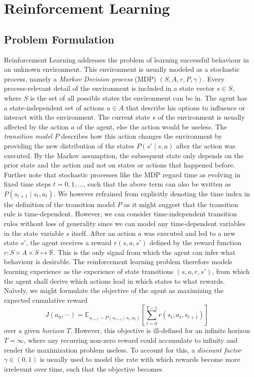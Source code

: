 \documentclass[a4paper, 11pt]{article}
\begin{document}
	\section{Reinforcement Learning}
	\subsection{Problem Formulation}
	Reinforcement Learning addresses the problem of learning successful behaviour in an unknown environment. This environment is usually modeled as a stochastic process, namely a \textit{Markov Decision process} (MDP) $(S,A,r,P,\gamma)$. Every process-relevant detail of the environment is included in a state vector $s\in S$, where $S$ is the set of all possible states the environment can be in. The agent has a state-independent set of actions $a\in A$ that describe his options to influence or interact with the environment. The current state $s$ of the environment is usually affected by the action $a$ of the agent, else the action would be useless. 
	The \textit{transition model} $P$ describes how this action changes the environment by providing the new distribution of the states $P(s'\mid s,a)$ after the action was executed. By the Markov assumption, the subsequent state only depends on the prior state and the action and not on states or actions that happened before. Further note that stochastic processes like the MDP regard time as evolving in fixed time steps $t=0,1,\dots$, such that the above term can also be written as $P(s_{t+1}\mid s_t,a_t)$. We however refrained from explicitly denoting the time index in the definition of the transition model $P$ as it might suggest that the transition rule is time-dependent. However, we can consider time-independent transition rules without loss of generality since we can model any time-dependent variables in the state variable $s$ itself. 
	After an action $a$ was executed and led to a new state $s'$, the agent receives a reward $r(s,a,s')$ defined by the reward function $r:S\times A\times S \mapsto \mathbb{R}$. This is the only signal from which the agent can infer what behaviour is desirable. 
	The reinforcement learning problem therefore models learning experience as the experience of state transitions $(s,a,r,s')$, from which the agent shall derive which actions lead in which states to what rewards.
	Na\"ively, we might formulate the objective of the agent as maximizing the expected cumulative reward 
	\[J(a_0,\cdots)=\mathbb{E}_{s_{t+1}\sim P(s_{t+1}\mid s_t,a_t)}\left[\sum_{t=0}^{T-1}r(s_t,a_t,s_{t+1})\right]\]
	over a given \textit{horizon} $T$. However, this objective is ill-defined for an infinite horizon $T=\infty$, where any recurring non-zero reward could accumulate to infinity and render the maximization problem useless. To account for this, a \textit{discount factor} $\gamma\in(0,1)$ is usually used to model the rate with which rewards become more irrelevant over time, such that the objective becomes
\end{document}
